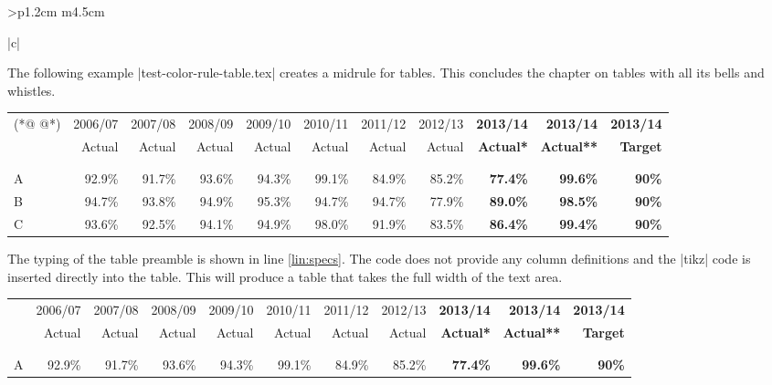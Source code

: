 \begin{tabular}{>{\bfseries}p{1.2cm} m{4.5cm}}
\begin{tabular}[t]{|c|}
\begin{longtable}
The following example |test-color-rule-table.tex| creates a midrule for tables. This concludes the chapter on tables with all its bells and whistles.

\begin{scriptexample}{}{}
\begin{teX}

{\scriptsize
\begin{tabular}[\textwidth]{@{}l r r r r r r r>{\bfseries\color{black!80}}r >{\bfseries\color{black!80}}r >{\bfseries\color{black!80}}r@{}}  (*@\label{lin:specs} @*)
& 2006/07 &2007/08 &2008/09 &2009/10 &2010/11 &2011/12 &2012/13 &2013/14 &2013/14 &2013/14\\
& Actual &Actual &Actual &Actual &Actual &Actual &Actual &Actual* &Actual** &Target\\
\begin{tikzpicture}[remember picture, overlay]
\path [midrule] (0,0) -- (\the\linewidth,0) node {};
\end{tikzpicture}\\ \\[-1pt]
A   &92.9\% &91.7\% &93.6\% &94.3\% &99.1\% &84.9\% &85.2\% &77.4\% &99.6\% &90\%\\

B  &94.7\% &93.8\% &94.9\% &95.3\% &94.7\% &94.7\% &77.9\% &89.0\% &98.5\% &90\%\\

C  &93.6\% &92.5\% &94.1\% &94.9\% &98.0\% &91.9\% &83.5\% &86.4\% &99.4\% &90\%\\
\end{tabular}
}
\end{teX}
\end{scriptexample}

The typing of the table preamble is shown in line \ref{lin:specs}. The code does not provide any column definitions and the |tikz| code is inserted directly into the table. This will produce a table that takes the full width of the
text area. 
\bigskip
\parindent 0pt


\newfontfamily{}
{\UI\footnotesize
\begin{tabular}[\textwidth]{@{}l r r r r r r r>{\bfseries\color{black!80}}r >{\bfseries\color{black!80}}r >{\bfseries\color{black!80}}r@{}} 
& 2006/07 &2007/08 &2008/09 &2009/10 &2010/11 &2011/12 &2012/13 &2013/14 &2013/14 &2013/14\\
& Actual &Actual &Actual &Actual &Actual &Actual &Actual &Actual* &Actual** &Target\\
\begin{tikzpicture}[remember picture, overlay]
\path [midrule] (0,0) -- (\the\linewidth,0) node {};
\end{tikzpicture}\\ \\[-1pt]
A   &92.9\% &91.7\% &93.6\% &94.3\% &99.1\% &84.9\% &85.2\% &77.4\% &99.6\% &90\%\\


\end{tabular}}
\end{longtable}
\end{tabular}
\end{tabular}
